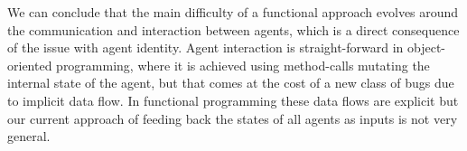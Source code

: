 We can conclude that the main difficulty of a functional approach evolves around the communication and interaction between agents, which is a direct consequence of the issue with agent identity. Agent interaction is straight-forward in object-oriented programming, where it is achieved using method-calls mutating the internal state of the agent, but that comes at the cost of a new class of bugs due to implicit data flow. In functional programming these data flows are explicit but our current approach of feeding back the states of all agents as inputs is not very general.